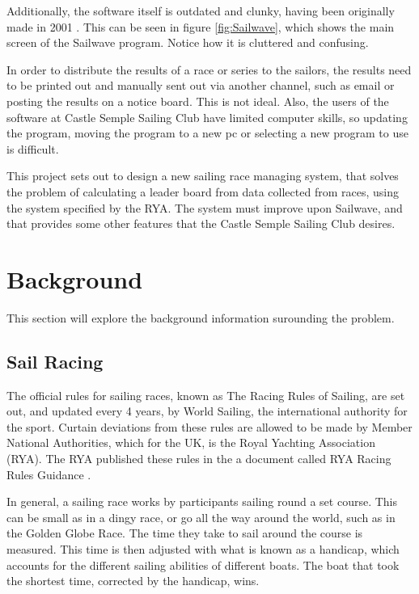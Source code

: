 \documentclass{l4proj}
\begin{document}
Additionally, the software itself is outdated and clunky, having been originally made in 2001 \citep{sailwave}. This can be seen in figure \ref{fig:Sailwave}, which shows the main screen of the Sailwave program. Notice how it is cluttered and confusing. 

In order to distribute the results of a race or series to the sailors, the results need to be printed out and manually sent out via another channel, such as email or posting the results on a notice board. This is not ideal. Also, the users of the software at Castle Semple Sailing Club have limited computer skills, so updating the program, moving the program to a new pc or selecting a new program to use is difficult.

This project sets out to design a new sailing race managing system, that solves the problem of calculating a leader board from data collected from races, using the system specified by the RYA. The system must improve upon Sailwave, and that provides some other features that the Castle Semple Sailing Club desires.


\chapter{Background}
This section will explore the background information surounding the problem.

\section{Sail Racing}
The official rules for sailing races, known as The Racing Rules of Sailing, are set out, and updated every 4 years, by World Sailing, the international authority for the sport. Curtain deviations from these rules are allowed to be made by Member National Authorities, which for the UK, is the Royal Yachting Association (RYA). The RYA published these rules in the a document called RYA Racing Rules Guidance \citep{RYAscore}.

In general, a sailing race works by participants sailing round a set course. This can be small as in a dingy race, or go all the way around the world, such as in the Golden Globe Race. The time they take to sail around the course is measured. This time is then adjusted with what is known as a handicap, which accounts for the different sailing abilities of different boats. The boat that took the shortest time, corrected by the handicap, wins.
\end{document}
